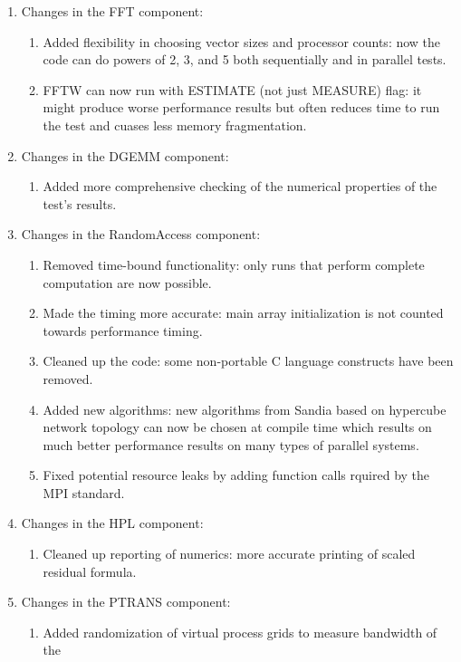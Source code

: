 \documentclass[twocolumn]{article}
\begin{document}
\begin{enumerate}
\item Changes in the FFT component:
   \begin{enumerate}
   \item Added flexibility in choosing vector sizes and processor counts:
   now the code can do powers of 2, 3, and 5 both sequentially and in parallel
   tests.
   \item FFTW can now run with ESTIMATE (not just MEASURE) flag: it might produce
   worse performance results but often reduces time to run the test and cuases
   less memory fragmentation.
   \end{enumerate}
\item Changes in the DGEMM component:
   \begin{enumerate}
   \item Added more comprehensive checking of the numerical properties of the
   test's results.
   \end{enumerate}
\item Changes in the RandomAccess component:
   \begin{enumerate}
   \item Removed time-bound functionality: only runs that perform complete
   computation are now possible.
   \item Made the timing more accurate: main array initialization is not counted
   towards performance timing.
   \item Cleaned up the code: some non-portable C language constructs have been
   removed.
   \item Added new algorithms: new algorithms from Sandia based on hypercube
   network topology can now be chosen at compile time which results on much
   better performance results on many types of parallel systems.
   \item Fixed potential resource leaks by adding function calls rquired by the MPI
   standard.
   \end{enumerate}
\item Changes in the HPL component:
   \begin{enumerate}
   \item Cleaned up reporting of numerics: more accurate printing of scaled
   residual formula.
   \end{enumerate}
\item Changes in the PTRANS component:
   \begin{enumerate}
   \item Added randomization of virtual process grids to measure bandwidth of the

\end{enumerate}
\end{enumerate}
\end{document}
